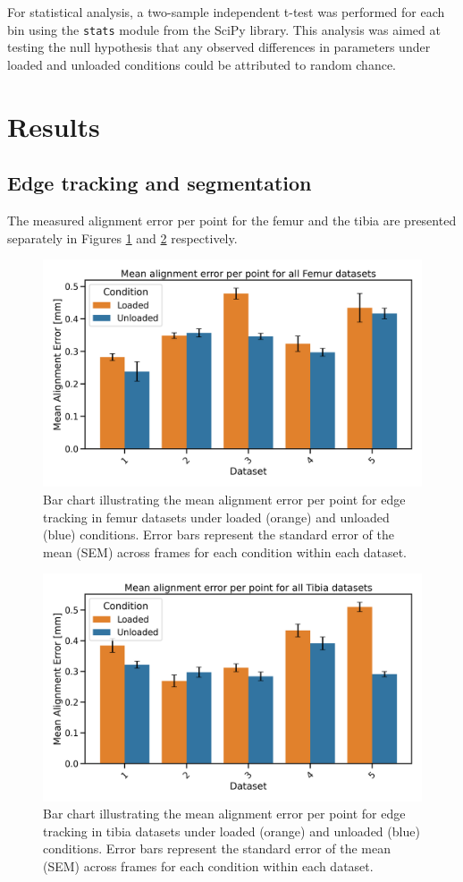 \documentclass{micro-econ-thesis}
\begin{document}
For statistical analysis, a two-sample independent t-test was performed for each bin using the \texttt{stats} module from the  SciPy library. This analysis was aimed at testing the null hypothesis that any observed differences in parameters under loaded and unloaded conditions could be attributed to random chance. 


\section{Results}
\label{sec:yetanother}

\subsection{Edge tracking and segmentation}

The measured alignment error per point for the femur and the tibia are presented separately in Figures \ref{fig:barfemur} and \ref{fig:bartibia} respectively. 
\begin{figure}[H]
	\centering
	\includegraphics[width=0.7\linewidth]{bar_no_1_3_Femur_both.png}
	\caption{Bar chart illustrating the mean alignment error per point for edge tracking in femur datasets under loaded (orange) and unloaded (blue) conditions. Error bars represent the standard error of the mean (SEM) across frames for each condition within each dataset.}
	\label{fig:barfemur}
\end{figure}

\begin{figure}[H]
	\centering
	\includegraphics[width=0.7\linewidth]{bar_no_1_3_Tibia_both.png}
	\caption{Bar chart illustrating the mean alignment error per point for edge tracking in tibia datasets under loaded (orange) and unloaded (blue) conditions. Error bars represent the standard error of the mean (SEM) across frames for each condition within each dataset.}
	\label{fig:bartibia}
\end{figure}
\end{document}
